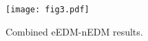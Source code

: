 \begin{figure}[p]
  \centering
  \texttt{[image: fig3.pdf]}
  \caption{Combined eEDM-nEDM results.}
  \label{fig:nEDM-eEDM}
\end{figure}